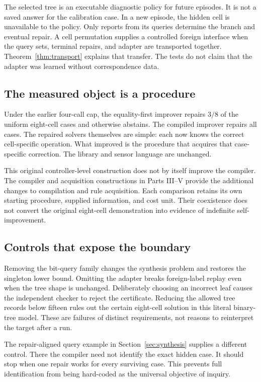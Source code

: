 \documentclass[11pt,letterpaper]{article}
\theoremstyle{plain}
\theoremstyle{definition}
\begin{document}
The selected tree is an executable diagnostic policy for future episodes. It is not a saved answer for the calibration case. In a new episode, the hidden cell is unavailable to the policy. Only reports from its queries determine the branch and eventual repair. A cell permutation supplies a controlled foreign interface when the query sets, terminal repairs, and adapter are transported together. Theorem~\ref{thm:transport} explains that transfer. The tests do not claim that the adapter was learned without correspondence data.

\subsection{The measured object is a procedure}
Under the earlier four-call cap, the equality-first improver repairs $3/8$ of the uniform eight-cell cases and otherwise abstains. The compiled improver repairs all cases. The repaired solvers themselves are simple: each now knows the correct cell-specific operation. What improved is the procedure that acquires that case-specific correction. The library and sensor language are unchanged.

This original controller-level construction does not by itself improve the compiler. The compiler and acquisition constructions in Parts III--V provide the additional changes to compilation and rule acquisition. Each comparison retains its own starting procedure, supplied information, and cost unit. Their coexistence does not convert the original eight-cell demonstration into evidence of indefinite self-improvement.

\subsection{Controls that expose the boundary}
Removing the bit-query family changes the synthesis problem and restores the singleton lower bound. Omitting the adapter breaks foreign-label replay even when the tree shape is unchanged. Deliberately choosing an incorrect leaf causes the independent checker to reject the certificate. Reducing the allowed tree records below fifteen rules out the certain eight-cell solution in this literal binary-tree model. These are failures of distinct requirements, not reasons to reinterpret the target after a run.

The repair-aligned query example in Section~\ref{sec:synthesis} supplies a different control. There the compiler need not identify the exact hidden case. It should stop when one repair works for every surviving case. This prevents full identification from being hard-coded as the universal objective of inquiry.
\end{document}
